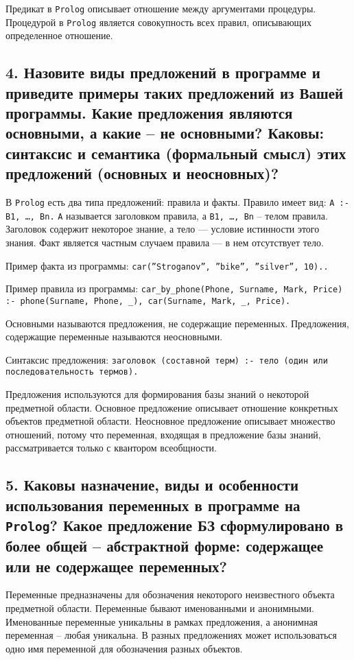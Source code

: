 Предикат в \texttt{Prolog} описывает отношение между аргументами процедуры. Процедурой в \texttt{Prolog} является совокупность всех правил, описывающих определенное отношение.

\subsection*{4. Назовите виды предложений в программе и приведите примеры таких предложений из Вашей программы. Какие предложения являются основными, а какие – не основными?  Каковы: синтаксис и семантика (формальный смысл) этих предложений (основных и неосновных)?}

В \texttt{Prolog} есть два типа предложений: правила и факты. Правило имеет вид: \texttt{A :- B1, \ldots, Bn.} 
\texttt{A} называется заголовком правила, а \texttt{B1, \ldots, Bn} – телом правила. Заголовок содержит некоторое знание, а тело --- условие истинности этого знания. Факт является частным случаем правила --- в нем отсутствует тело.

Пример факта из программы: \texttt{car(''Stroganov'', ''bike'', ''silver'', 10)..}


Пример правила из программы: \texttt{car\_by\_phone(Phone, Surname, Mark, Price) :- phone(Surname, Phone, \_), car(Surname, Mark, \_, Price).}

Основными называются предложения, не содержащие переменных. Предложения, содержащие переменные называются неосновными. 

Синтаксис предложения: \texttt{заголовок (составной терм) :- тело (один или последовательность термов).} 

Предложения используются для формирования базы знаний о некоторой предметной области. Основное предложение описывает отношение конкретных объектов предметной области. Неосновное предложение описывает множество отношений, потому что переменная, входящая в предложение базы знаний, рассматривается только с квантором всеобщности.

\subsection*{5. Каковы назначение, виды и особенности использования переменных в программе на \texttt{Prolog}? Какое предложение БЗ сформулировано в более общей – абстрактной форме: содержащее или не содержащее переменных?}

Переменные предназначены для обозначения некоторого неизвестного объекта предметной области. Переменные бывают именованными и анонимными. Именованные переменные уникальны в рамках предложения, а анонимная переменная – любая уникальна. В разных предложениях может использоваться одно имя переменной для обозначения разных объектов.

